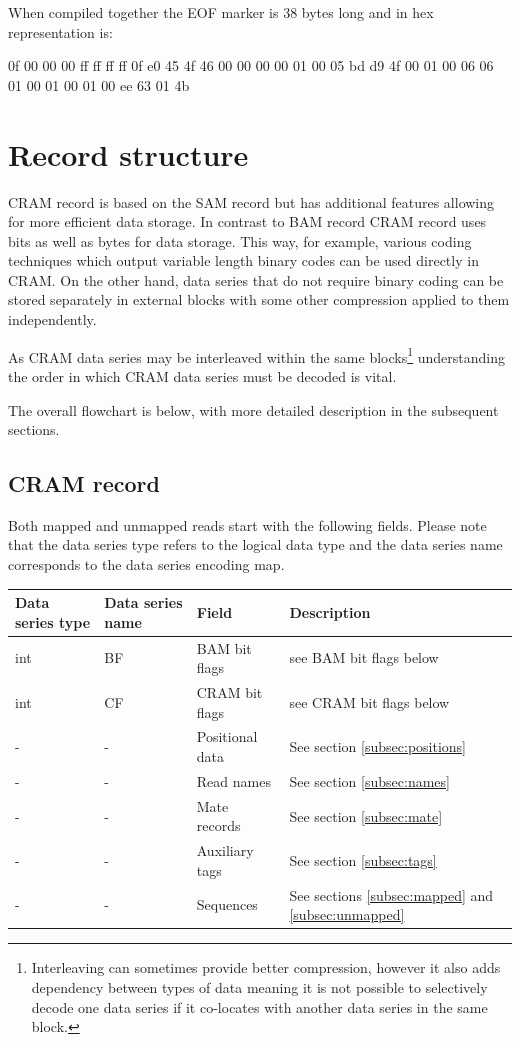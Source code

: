 \documentclass[a4paper]{article}
\begin{document}
When compiled together the EOF marker is 38 bytes long and in hex representation 
is:

0f 00 00 00 ff ff ff ff 0f e0 45 4f 46 00 00 00 00 01 00 05 bd d9 4f 00 01 00 06 06 01 00 01 00 01 00 ee 63 01 4b

\section{\textbf{Record structure}}
\label{sec:record}

CRAM record is based on the SAM record but has additional features allowing for 
more efficient data storage.  In contrast to BAM record CRAM record uses bits as 
well as bytes for data storage. This way, for example, various coding techniques 
which output variable length binary codes can be used directly in CRAM. On the 
other hand, data series that do not require binary coding can be stored separately 
in external blocks with some other compression applied to them independently.

As CRAM data series may be interleaved within the same blocks\footnote{Interleaving can sometimes provide better compression, however it also adds dependency between types of data meaning it is not possible to selectively decode one data series if it co-locates with another data series in the same block.} understanding the order in which CRAM data series must be decoded is vital.

The overall flowchart is below, with more detailed description in the subsequent sections.

\algnewcommand{}

\subsection{\textbf{CRAM record}}

Both mapped and unmapped reads start with the following fields. Please note that 
the data series type refers to the logical data type and the data series name corresponds 
to the data series encoding map.

\begin{tabular}{|>{\raggedright}p{70pt}|>{\raggedright}p{75pt}|>{\raggedright}p{90pt}|>{\raggedright}p{171pt}|}
\hline
\textbf{Data series type} & \textbf{Data series name} & \textbf{Field} & \textbf{Description}\tabularnewline
\hline
int & BF & BAM bit flags & see BAM bit flags below\tabularnewline
\hline
int & CF & CRAM bit flags & see CRAM bit flags below\tabularnewline
\hline
- & - & Positional data & See section \ref{subsec:positions}\tabularnewline
\hline
- & - & Read names & See section \ref{subsec:names}\tabularnewline
\hline
- & - & Mate records & See section \ref{subsec:mate}\tabularnewline
\hline
- & - & Auxiliary tags & See section \ref{subsec:tags}\tabularnewline
\hline
- & - & Sequences & See sections \ref{subsec:mapped} and \ref{subsec:unmapped}\tabularnewline
\hline
\end{tabular}
\end{document}
